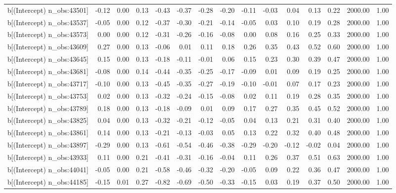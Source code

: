 \begin{table}[ht]
\begin{tabular}{rrrrrrrrrrrrrrr}
  b[(Intercept) n\_obs:43501] & -0.12 & 0.00 & 0.13 & -0.43 & -0.37 & -0.28 & -0.20 & -0.11 & -0.03 & 0.04 & 0.13 & 0.22 & 2000.00 & 1.00 \\ 
  b[(Intercept) n\_obs:43537] & -0.05 & 0.00 & 0.12 & -0.37 & -0.30 & -0.21 & -0.14 & -0.05 & 0.03 & 0.10 & 0.19 & 0.28 & 2000.00 & 1.00 \\ 
  b[(Intercept) n\_obs:43573] & 0.00 & 0.00 & 0.12 & -0.31 & -0.26 & -0.16 & -0.08 & 0.00 & 0.08 & 0.16 & 0.25 & 0.33 & 2000.00 & 1.00 \\ 
  b[(Intercept) n\_obs:43609] & 0.27 & 0.00 & 0.13 & -0.06 & 0.01 & 0.11 & 0.18 & 0.26 & 0.35 & 0.43 & 0.52 & 0.60 & 2000.00 & 1.00 \\ 
  b[(Intercept) n\_obs:43645] & 0.15 & 0.00 & 0.13 & -0.18 & -0.11 & -0.01 & 0.06 & 0.15 & 0.23 & 0.30 & 0.39 & 0.47 & 2000.00 & 1.00 \\ 
  b[(Intercept) n\_obs:43681] & -0.08 & 0.00 & 0.14 & -0.44 & -0.35 & -0.25 & -0.17 & -0.09 & 0.01 & 0.09 & 0.19 & 0.25 & 2000.00 & 1.00 \\ 
  b[(Intercept) n\_obs:43717] & -0.10 & 0.00 & 0.13 & -0.45 & -0.35 & -0.27 & -0.19 & -0.10 & -0.01 & 0.07 & 0.17 & 0.23 & 2000.00 & 1.00 \\ 
  b[(Intercept) n\_obs:43753] & 0.02 & 0.00 & 0.13 & -0.32 & -0.24 & -0.15 & -0.08 & 0.02 & 0.11 & 0.19 & 0.28 & 0.35 & 2000.00 & 1.00 \\ 
  b[(Intercept) n\_obs:43789] & 0.18 & 0.00 & 0.13 & -0.18 & -0.09 & 0.01 & 0.09 & 0.17 & 0.27 & 0.35 & 0.45 & 0.52 & 2000.00 & 1.00 \\ 
  b[(Intercept) n\_obs:43825] & 0.04 & 0.00 & 0.13 & -0.32 & -0.21 & -0.12 & -0.05 & 0.04 & 0.13 & 0.21 & 0.31 & 0.40 & 2000.00 & 1.00 \\ 
  b[(Intercept) n\_obs:43861] & 0.14 & 0.00 & 0.13 & -0.21 & -0.13 & -0.03 & 0.05 & 0.13 & 0.22 & 0.32 & 0.40 & 0.48 & 2000.00 & 1.00 \\ 
  b[(Intercept) n\_obs:43897] & -0.29 & 0.00 & 0.13 & -0.61 & -0.54 & -0.46 & -0.38 & -0.29 & -0.20 & -0.12 & -0.02 & 0.04 & 2000.00 & 1.00 \\ 
  b[(Intercept) n\_obs:43933] & 0.11 & 0.00 & 0.21 & -0.41 & -0.31 & -0.16 & -0.04 & 0.11 & 0.26 & 0.37 & 0.51 & 0.63 & 2000.00 & 1.00 \\ 
  b[(Intercept) n\_obs:44041] & -0.05 & 0.00 & 0.21 & -0.58 & -0.46 & -0.32 & -0.20 & -0.05 & 0.09 & 0.22 & 0.36 & 0.47 & 2000.00 & 1.00 \\ 
  b[(Intercept) n\_obs:44185] & -0.15 & 0.01 & 0.27 & -0.82 & -0.69 & -0.50 & -0.33 & -0.15 & 0.03 & 0.19 & 0.37 & 0.50 & 2000.00 & 1.00 \\ 

\end{tabular}
\end{table}
